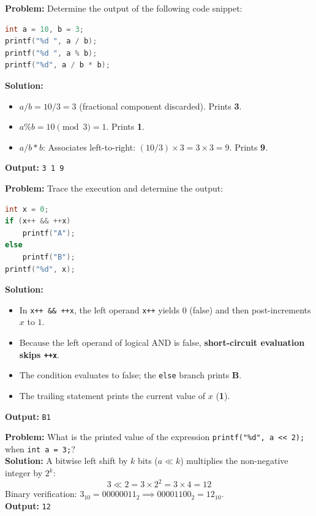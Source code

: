 \begin{tcolorbox}[colback=white,colframe=primary,title=\textbf{Question 2: Integer Arithmetic and Precedence}]
\textbf{Problem:} Determine the output of the following code snippet:
\begin{lstlisting}[language=C]
int a = 10, b = 3;
printf("%d ", a / b);
printf("%d ", a % b);
printf("%d", a / b * b);
\end{lstlisting}
\textbf{Solution:}
\begin{itemize}[leftmargin=*]
    \item $a / b = 10 / 3 = 3$ (fractional component discarded). Prints \textbf{3}.
    \item $a \% b = 10 \pmod 3 = 1$. Prints \textbf{1}.
    \item $a / b * b$: Associates left-to-right: $(10 / 3) \times 3 = 3 \times 3 = 9$. Prints \textbf{9}.
\end{itemize}
\textbf{Output:} \texttt{3 1 9}
\end{tcolorbox}

\begin{tcolorbox}[colback=white,colframe=primary,title=\textbf{Question 3: Short-Circuit Logic with Side Effects}]
\textbf{Problem:} Trace the execution and determine the output:
\begin{lstlisting}[language=C]
int x = 0;
if (x++ && ++x)
    printf("A");
else
    printf("B");
printf("%d", x);
\end{lstlisting}
\textbf{Solution:}
\begin{itemize}[leftmargin=*]
    \item In \texttt{x++ \&\& ++x}, the left operand \texttt{x++} yields $0$ (false) and then post-increments $x$ to $1$.
    \item Because the left operand of logical AND is false, \textbf{short-circuit evaluation skips \texttt{++x}}.
    \item The condition evaluates to false; the \texttt{else} branch prints \textbf{B}.
    \item The trailing statement prints the current value of $x$ (\textbf{1}).
\end{itemize}
\textbf{Output:} \texttt{B1}
\end{tcolorbox}

\begin{tcolorbox}[colback=white,colframe=primary,title=\textbf{Question 4: Bitwise Left Shift Multiplication}]
\textbf{Problem:} What is the printed value of the expression \texttt{printf("\%d", a << 2);} when \texttt{int a = 3;}? \\
\textbf{Solution:} A bitwise left shift by $k$ bits ($a \ll k$) multiplies the non-negative integer by $2^k$:
\[
3 \ll 2 = 3 \times 2^2 = 3 \times 4 = 12
\]
Binary verification: $3_{10} = 00000011_2 \implies 00001100_2 = 12_{10}$. \\
\textbf{Output:} \texttt{12}
\end{tcolorbox}

